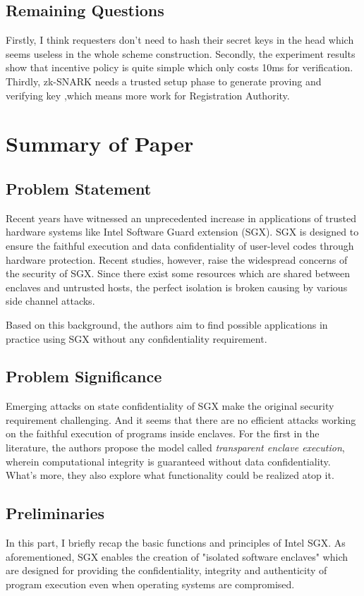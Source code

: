 \documentclass[conference]{IEEEtran}
\begin{document}
\subsection{Remaining Questions}
Firstly, I think requesters don't need to hash their secret keys in the head which seems useless in the whole scheme construction.
%
Secondly, the experiment results show that incentive policy is quite simple which only costs 10ms for verification.
%
Thirdly, zk-SNARK needs a trusted setup phase to generate proving and verifying key ,which means more work for Registration Authority.


\section{Summary of Paper\cite{tramer2017sealed}}

\subsection{Problem Statement}
Recent years have witnessed an unprecedented increase in applications of trusted hardware systems like Intel Software Guard extension (SGX).
%
SGX is designed to ensure the faithful execution and data confidentiality of user-level codes through hardware protection.
%
Recent studies, however, raise the widespread concerns of the security of SGX.
%
Since there exist some resources which are shared between enclaves and untrusted hosts, the perfect isolation is broken causing by various side channel attacks.

Based on this background, the authors aim to find possible applications in practice using SGX without any confidentiality requirement.

\subsection{Problem Significance}
Emerging attacks on state confidentiality of SGX make the original security requirement challenging.
%
And it seems that there are no efficient attacks working on the faithful execution of programs inside enclaves.
%
For the first in the literature, the authors propose the model called \textsl{transparent enclave execution}, wherein computational integrity is guaranteed without data confidentiality.
%
What's more, they also explore what functionality could be realized atop it.


\subsection{Preliminaries}
In this part, I briefly recap the basic functions and principles of Intel SGX.
%
As aforementioned, SGX enables the creation of "isolated software enclaves" which are designed for providing the confidentiality, integrity and authenticity of program execution even when operating systems are compromised.
\end{document}
